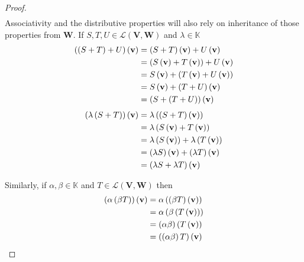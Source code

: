 \begin{proof}
\begin{align*}
    \end{align*}
   Associativity and the distributive properties will also rely on inheritance of those properties from \( \mathbf{W} \). If \( S,T, U \in \mathcal{L} \left( \mathbf{V}, \mathbf{W} \right) \) and \( \lambda \in \mathbb{K} \)
   \begin{align*}
        \left( \left( S +T \right) + U \right) \left( \vb{v} \right) &= \left( S+T \right)\left( \vb{v} \right) + U \left( \vb{v} \right) \\ 
        &= \left( S \left( \vb{v} \right) + T \left( \vb{v} \right) \right) + U \left( \vb{v} \right) \\ 
        &= S \left( \vb{v} \right) +\left(  T \left( \vb{v} \right) + U \left( \vb{v} \right)\right) \\
        &= S \left( \vb{v} \right) + \left( T+U \right) \left( \vb{v} \right) \\
        &= \left( S + \left( T +U \right) \right) \left( \vb{v} \right)
   \end{align*}
   \begin{align*}
    \left( \lambda \left( S +T \right) \right) \left( \vb{v} \right) &= \lambda \left( \left( S+T  \right)\left( \vb{v} \right) \right) \\ 
    &= \lambda \left( S \left( \vb{v} \right) + T \left( \vb{v} \right)\right) \\
    &= \lambda \left( S \left( \vb{v} \right) \right) + \lambda \left( T \left( \vb{v} \right) \right) \\
    &= \left( \lambda S \right) \left( \vb{v} \right) +  \left( \lambda T \right) \left( \vb{v} \right) \\
    &= \left( \lambda S + \lambda T \right) \left( \vb{v} \right)
   \end{align*}
   
   Similarly, if \( \alpha, \beta \in \mathbb{K} \) and \( T \in \mathcal{L} \left( \mathbf{V}, \mathbf{W} \right) \) then 
   \begin{align*}
    \left( \alpha \left( \beta T \right) \right) \left( \vb{v} \right) &= \alpha \left( \left( \beta T \right) \left( \vb{v} \right) \right) \\
    &= \alpha \left( \beta \left( T \left( \vb{v} \right) \right) \right) \\
    &= \left( \alpha \beta \right)\left( T \left( \vb{v} \right) \right) \\
    &= \left( \left( \alpha \beta \right)T \right) \left( \vb{v} \right)
   \end{align*}
   

\end{proof}
